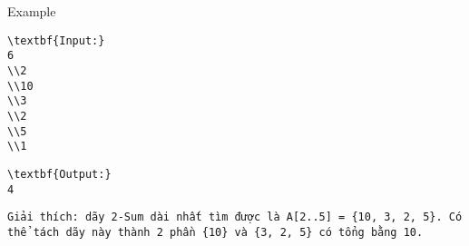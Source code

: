 Example
\begin{verbatim}
\textbf{Input:}
6
\\2
\\10
\\3
\\2
\\5
\\1 \end{verbatim}
\begin{verbatim}
\textbf{Output:}
4\end{verbatim}
\begin{verbatim}
Giải thích: dãy 2-Sum dài nhất tìm được là A[2..5] = {10, 3, 2, 5}. Có thể tách dãy này thành 2 phần {10} và {3, 2, 5} có tổng bằng 10.\end{verbatim}